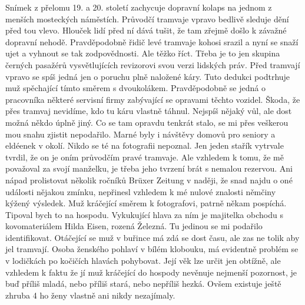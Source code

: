 
Snímek z přelomu 19. a 20. století zachycuje dopravní kolaps na jednom
z menších mosteckých náměstích. Průvodčí tramvaje vpravo bedlivě
sleduje dění před tou vlevo. Hlouček lidí před ní dává tušit, že tam
zřejmě došlo k závažné dopravní nehodě. Pravděpodobně řidič levé
tramvaje kohosi srazil a nyní se snaží ujet a vyhnout se tak
zodpovědnosti. Ale těžko říct. Třeba je to jen skupina černých
pasažérů vysvětlujících revizorovi svou verzi lidských práv. Před
tramvají vpravo se spíš jedná jen o poruchu plně naložené káry. Tuto
dedukci podtrhuje muž spěchající tímto směrem s dvoukolákem.
Pravděpodobně se jedná o pracovníka některé servisní firmy zabývající
se opravami těchto vozidel. Škoda, že přes tramvaj nevidíme, kdo tu
káru vlastně táhnul. Nejspíš nějaký vůl, ale dost možná někdo úplně
jiný. Co se tam opravdu tenkrát stalo, se mi přes veškerou mou snahu
zjistit nepodařilo. Marné byly i návštěvy domovů pro seniory a
eldéenek v okolí. Nikdo se té na fotografii nepoznal. Jen jeden stařík
vytrvale tvrdil, že on je oním průvodčím pravé tramvaje. Ale vzhledem
k tomu, že mě považoval za svojí manželku, je třeba jeho tvrzení brát
s nemalou rezervou. Ani nápad prolistovat několik ročníků Brüxer
Zeitung v naději, že snad najdu o oné události nějakou zmínku,
nepřinesl vzhledem k mé nulové znalosti němčiny kýžený výsledek. Muž
kráčející směrem k fotografovi, patrně někam pospíchá. Tipoval bych to
na hospodu. Vykukující hlava za ním je majitelka obchodu s
kovomateriálem Hilda Eisen, rozená Železná. Tu jedinou se mi podařilo
identifikovat. Otáčející se muž v buřince má zdá se dost času, ale zas
ne tolik aby jel tramvají. Osoba ženského pohlaví v bílém klobouku, má
evidentně problém se v lodičkách po kočičích hlavách pohybovat. Její
věk lze určit jen obtížně, ale vzhledem k faktu že jí muž kráčející do
hospody nevěnuje nejmenší pozornost, je buď příliš mladá, nebo příliš
stará, nebo nepříliš hezká. Ovšem existuje ještě zhruba 4%
ho ženy vlastně ani nikdy nezajímaly.

